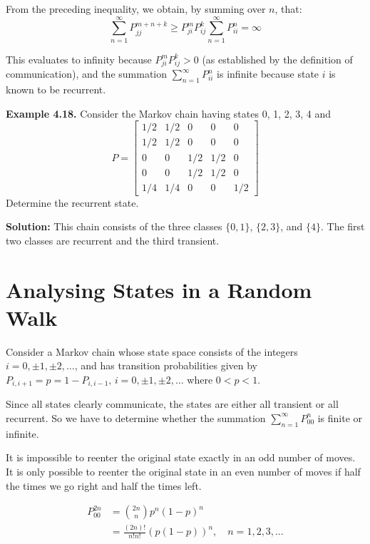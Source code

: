 From the preceding inequality, we obtain, by summing over $n$, that:
\[ \sum_{n=1}^\infty P_{jj}^{m+n+k} \ge P_{ji}^m P_{ij}^k \sum_{n=1}^\infty P_{ii}^n = \infty \]

This evaluates to infinity because $P_{ji}^m P_{ij}^k > 0$ (as established by the definition of communication), and the summation $\sum_{n=1}^\infty P_{ii}^n$ is infinite because state $i$ is known to be recurrent.

\vspace{0.5cm}

\textbf{Example 4.18.} Consider the Markov chain having states 0, 1, 2, 3, 4 and
\[ P = \begin{bmatrix} 
1/2 & 1/2 & 0 & 0 & 0 \\ 
1/2 & 1/2 & 0 & 0 & 0 \\ 
0 & 0 & 1/2 & 1/2 & 0 \\ 
0 & 0 & 1/2 & 1/2 & 0 \\ 
1/4 & 1/4 & 0 & 0 & 1/2 
\end{bmatrix} \]
Determine the recurrent state.

\textbf{Solution:} This chain consists of the three classes $\{0, 1\}$, $\{2, 3\}$, and $\{4\}$. The first two classes are recurrent and the third transient.

\vspace{0.5cm}
\section{\textcolor{secondary}{Analysing States in a Random Walk}}

Consider a Markov chain whose state space consists of the integers $i = 0, \pm 1, \pm 2, \dots$, and has transition probabilities given by $P_{i,i+1} = p = 1 - P_{i,i-1}, \, i = 0, \pm 1, \pm 2, \dots$ where $0 < p < 1$.

Since all states clearly communicate, the states are either all transient or all recurrent. So we have to determine whether the summation $\sum_{n=1}^\infty P_{00}^n$ is finite or infinite.

It is impossible to reenter the original state exactly in an odd number of moves. It is only possible to reenter the original state in an even number of moves if half the times we go right and half the times left.

\begin{align*}
    P_{00}^{2n} &= \binom{2n}{n} p^n (1-p)^n \\
    &= \frac{(2n)!}{n!n!} (p(1-p))^n, \quad n = 1, 2, 3, \dots
\end{align*}

